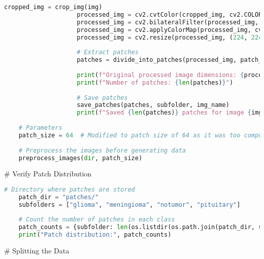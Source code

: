 \begin{lstlisting}[language=Python]
                    cropped_img = crop_img(img)
                    processed_img = cv2.cvtColor(cropped_img, cv2.COLOR_RGB2GRAY)
                    processed_img = cv2.bilateralFilter(processed_img, 2, 50, 50)
                    processed_img = cv2.applyColorMap(processed_img, cv2.COLORMAP_BONE)
                    processed_img = cv2.resize(processed_img, (224, 224))
    
                    # Extract patches
                    patches = divide_into_patches(processed_img, patch_size)
    
                    print(f"Original processed image dimensions: {processed_img.shape}")
                    print(f"Number of patches: {len(patches)}")
    
                    # Save patches
                    save_patches(patches, subfolder, img_name)
                    print(f"Saved {len(patches)} patches for image {img_name} in {subfolder}")
    
    # Parameters
    patch_size = 64  # Modified to patch size of 64 as it was too computationally heavy
    
    # Preprocess the images before generating data
    preprocess_images(dir, patch_size)
\end{lstlisting}

# Verify Patch Distribution
\begin{lstlisting}[language=Python]
    # Directory where patches are stored
    patch_dir = "patches/"
    subfolders = ["glioma", "meningioma", "notumor", "pituitary"]
    
    # Count the number of patches in each class
    patch_counts = {subfolder: len(os.listdir(os.path.join(patch_dir, subfolder))) for subfolder in subfolders}
    print("Patch distribution:", patch_counts)
\end{lstlisting}


# Splitting the Data

